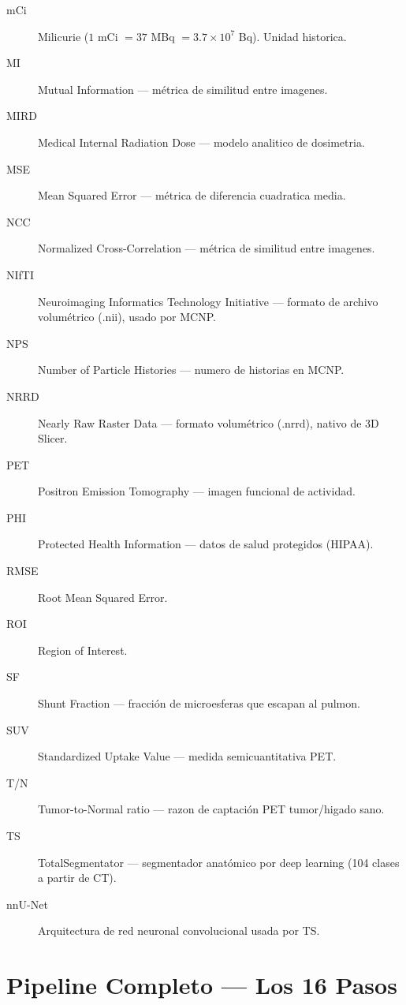 \documentclass[12pt,a4paper]{article}
\begin{document}
\begin{description}
    \item[mCi] Milicurie ($1$ mCi $= 37$ MBq $= 3.7 \times 10^7$ Bq). Unidad historica.
    \item[MI] Mutual Information --- métrica de similitud entre imagenes.
    \item[MIRD] Medical Internal Radiation Dose --- modelo analitico de dosimetria.
    \item[MSE] Mean Squared Error --- métrica de diferencia cuadratica media.
    \item[NCC] Normalized Cross-Correlation --- métrica de similitud entre imagenes.
    \item[NIfTI] Neuroimaging Informatics Technology Initiative --- formato
          de archivo volumétrico (.nii), usado por MCNP.
    \item[NPS] Number of Particle Histories --- numero de historias en MCNP.
    \item[NRRD] Nearly Raw Raster Data --- formato volumétrico (.nrrd),
          nativo de 3D Slicer.
    \item[PET] Positron Emission Tomography --- imagen funcional de actividad.
    \item[PHI] Protected Health Information --- datos de salud protegidos (HIPAA).
    \item[RMSE] Root Mean Squared Error.
    \item[ROI] Region of Interest.
    \item[SF] Shunt Fraction --- fracción de microesferas que escapan al pulmon.
    \item[SUV] Standardized Uptake Value --- medida semicuantitativa PET.
    \item[T/N] Tumor-to-Normal ratio --- razon de captación PET tumor/higado sano.
    \item[TS] TotalSegmentator --- segmentador anatómico por deep learning
          (104 clases a partir de CT).
    \item[nnU-Net] Arquitectura de red neuronal convolucional usada por TS.
\end{description}

\newpage

\tableofcontents
\newpage

\section{Pipeline Completo --- Los 16 Pasos}
\end{document}
